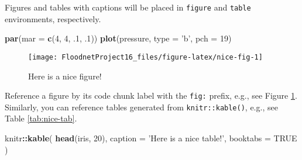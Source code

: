 \documentclass[]{book}
\newenvironment{Shaded}{\begin{snugshade}}{\end{snugshade}}
\newcommand{\DataTypeTok}[1]{\textcolor[rgb]{0.13,0.29,0.53}{#1}}
\newcommand{\DecValTok}[1]{\textcolor[rgb]{0.00,0.00,0.81}{#1}}
\newcommand{\FloatTok}[1]{\textcolor[rgb]{0.00,0.00,0.81}{#1}}
\newcommand{\KeywordTok}[1]{\textcolor[rgb]{0.13,0.29,0.53}{\textbf{#1}}}
\newcommand{\NormalTok}[1]{#1}
\newcommand{\OperatorTok}[1]{\textcolor[rgb]{0.81,0.36,0.00}{\textbf{#1}}}
\newcommand{\OtherTok}[1]{\textcolor[rgb]{0.56,0.35,0.01}{#1}}
\newcommand{\StringTok}[1]{\textcolor[rgb]{0.31,0.60,0.02}{#1}}
\theoremstyle{definition}
\theoremstyle{definition}
\theoremstyle{definition}
\theoremstyle{remark}
\begin{document}
Figures and tables with captions will be placed in \texttt{figure} and
\texttt{table} environments, respectively.

\begin{Shaded}
\begin{Highlighting}[]
\KeywordTok{par}\NormalTok{(}\DataTypeTok{mar =} \KeywordTok{c}\NormalTok{(}\DecValTok{4}\NormalTok{, }\DecValTok{4}\NormalTok{, }\FloatTok{.1}\NormalTok{, }\FloatTok{.1}\NormalTok{))}
\KeywordTok{plot}\NormalTok{(pressure, }\DataTypeTok{type =} \StringTok{'b'}\NormalTok{, }\DataTypeTok{pch =} \DecValTok{19}\NormalTok{)}
\end{Highlighting}
\end{Shaded}

\begin{figure}

{\centering \texttt{[image: FloodnetProject16\_files/figure-latex/nice-fig-1]} 

}

\caption{Here is a nice figure!}\label{fig:nice-fig}
\end{figure}

Reference a figure by its code chunk label with the \texttt{fig:}
prefix, e.g., see Figure \ref{fig:nice-fig}. Similarly, you can
reference tables generated from \texttt{knitr::kable()}, e.g., see Table
\ref{tab:nice-tab}.

\begin{Shaded}
\begin{Highlighting}[]
\NormalTok{knitr}\OperatorTok{::}\KeywordTok{kable}\NormalTok{(}
  \KeywordTok{head}\NormalTok{(iris, }\DecValTok{20}\NormalTok{), }\DataTypeTok{caption =} \StringTok{'Here is a nice table!'}\NormalTok{,}
  \DataTypeTok{booktabs =} \OtherTok{TRUE}
\NormalTok{)}
\end{Highlighting}
\end{Shaded}
\end{document}
